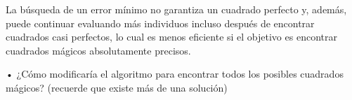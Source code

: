 \documentclass{report}
\begin{document}
    La búsqueda de un error mínimo no garantiza un cuadrado perfecto y, además, puede continuar evaluando más individuos incluso después de encontrar cuadrados casi perfectos, lo cual es menos eficiente si el objetivo es encontrar cuadrados mágicos absolutamente precisos.

    •  ¿Cómo modificaría el algoritmo para encontrar todos los posibles cuadrados mágicos? (recuerde que existe más de una solución)
\end{document}
